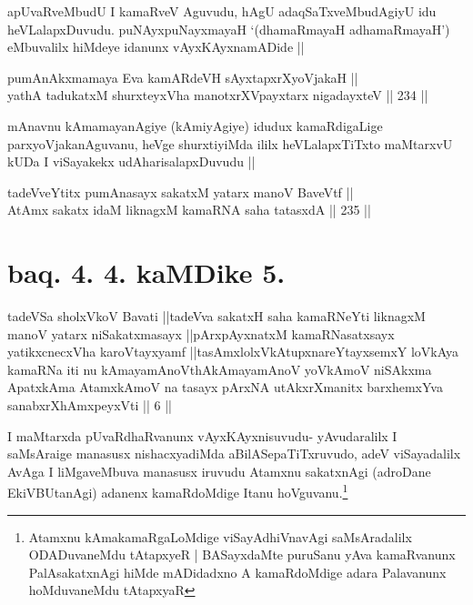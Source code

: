 \begin{artha}
apUvaRveMbudU I kamaRveV Aguvudu, hAgU adaqSaTxveMbudAgiyU idu
heVLalapxDuvudu. puNAyxpuNayxmayaH `(dhamaRmayaH adhamaRmayaH')
eMbuvalilx hiMdeye idanunx vAyxKAyxnamADide ||
\end{artha}


\begin{shl}
pumAnAkxmamaya Eva kamARdeVH sAyxtapxrXyoVjakaH || \\
yathA tadukatxM shurxteyxVha manotxrXV\s payxtarx nigadayxteV ||  234 ||  
\end{shl}

\begin{artha}
mAnavnu kAmamayanAgiye (kAmiyAgiye) idudux kamaRdigaLige
parxyoVjakanAguvanu, heVge shurxtiyiMda ililx heVLalapxTiTxto
maMtarxvU kUDa I viSayakekx udAharisalapxDuvudu ||
\end{artha}


\begin{shl}
tadeVveYtitx pumAnasayx sakatxM yatarx manoV BaveVtf || \\
AtAmx sakatx idaM liknagxM kamaRNA saha tatasxdA ||  235 ||  
\end{shl}

\section*{baq. 4. 4. kaMDike 5.}

\begin{shl}
tadeVSa sholxVkoV Bavati ||tadeVva sakatxH saha kamaRNeYti liknagxM manoV yatarx niSakatxmasayx ||pArxpAyxnatxM kamaRNasatxsayx yatikxcnecxVha karoVtayxyamf ||tasAmxlolxVkAtupxnareYtayxsemxY loVkAya kamaRNa iti nu kAmayamAnoV\s thAkAmayamAnoV yoV\s kAmoV niSAkxma ApatxkAma AtamxkAmoV na tasayx pArxNA utAkxrXmanitx barxhemxYva sanabxrXhAmxpeyxVti || 6 ||
\end{shl}

\begin{artha}
I maMtarxda pUvaRdhaRvanunx vAyxKAyxnisuvudu- yAvudaralilx I
saMsAraige manasusx nishacxyadiMda aBilASepaTiTxruvudo, adeV
viSayadalilx AvAga I liMgaveMbuva manasusx iruvudu Atamxnu sakatxnAgi
(adroDane EkiVBUtanAgi) adanenx kamaRdoMdige Itanu
hoVguvanu.\footnote{Atamxnu kAmakamaRgaLoMdige viSayAdhiVnavAgi
  saMsAradalilx ODADuvaneMdu tAtapxyeR | BASayxdaMte puruSanu yAva
  kamaRvanunx PalAsakatxnAgi hiMde mADidadxno A kamaRdoMdige adara
  Palavanunx hoMduvaneMdu tAtapxyaR}
\end{artha}

